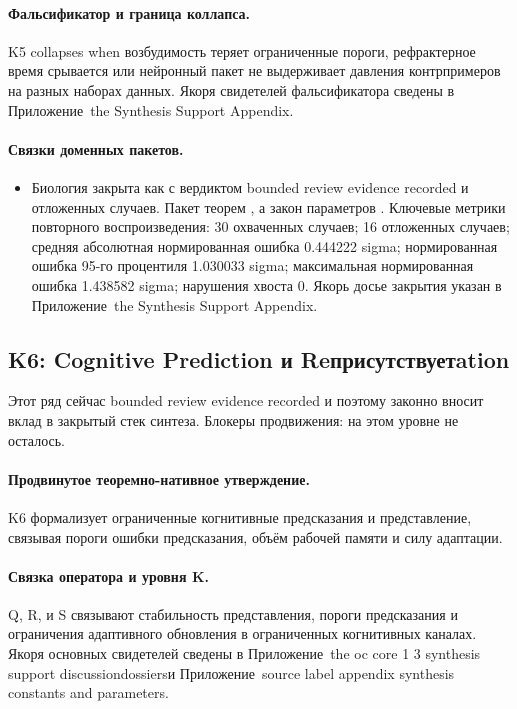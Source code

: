 \paragraph{Фальсификатор и граница коллапса.}
K5 collapses when возбудимость теряет ограниченные пороги, рефрактерное время срывается или нейронный пакет не выдерживает давления контрпримеров на разных наборах данных.
Якоря свидетелей фальсификатора сведены в Приложение~the Synthesis Support Appendix.

\paragraph{Связки доменных пакетов.}
\begin{itemize}[leftmargin=1.6em,nosep]
\item Биология закрыта как  с вердиктом bounded review evidence recorded и  отложенных случаев. Пакет теорем , а закон параметров . Ключевые метрики повторного воспроизведения: 30 охваченных случаев; 16 отложенных случаев; средняя абсолютная нормированная ошибка 0.444222 sigma; нормированная ошибка 95-го процентиля 1.030033 sigma; максимальная нормированная ошибка 1.438582 sigma; нарушения хвоста 0. Якорь досье закрытия указан в Приложение~the Synthesis Support Appendix.
\end{itemize}

\subsection{K6: Cognitive Prediction и Reприсутствуетation}
\label{sec:oc-core-1-3-synthesis-k6}
Этот ряд сейчас bounded review evidence recorded и поэтому законно вносит вклад в закрытый стек синтеза.
Блокеры продвижения: на этом уровне не осталось.

\paragraph{Продвинутое теоремно-нативное утверждение.}
K6 формализует ограниченные когнитивные предсказания и представление, связывая пороги ошибки предсказания, объём рабочей памяти и силу адаптации.

\paragraph{Связка оператора и уровня K.}
Q, R, и S связывают стабильность представления, пороги предсказания и ограничения адаптивного обновления в ограниченных когнитивных каналах.
Якоря основных свидетелей сведены в Приложение~the oc core 1 3 synthesis support discussiondossiersи Приложение~source label appendix synthesis constants and parameters.

